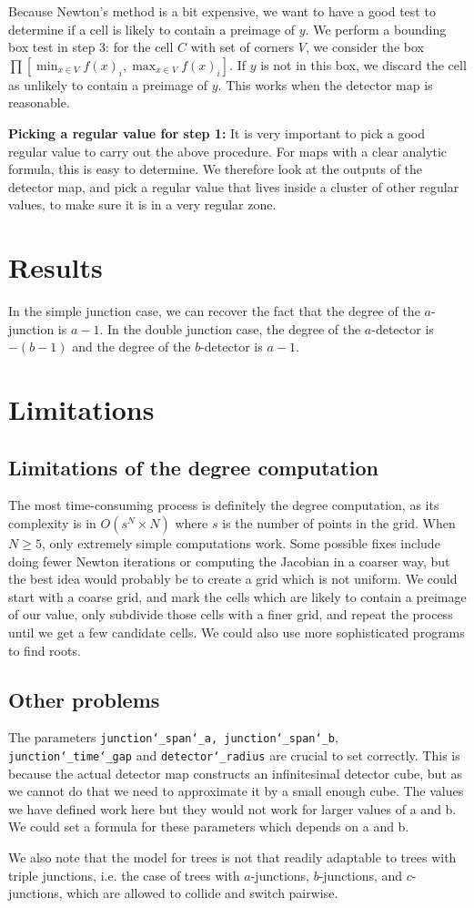\documentclass[12pt]{amsart}
\theoremstyle{plain}
\theoremstyle{definition}
\theoremstyle{remark}
\begin{document}
Because Newton's method is a bit expensive, we want to have a good test to determine if a cell is likely to contain a preimage of $y$.
We perform a bounding box test in step 3: for the cell $C$ with set of corners $V$, 
we consider the box $\displaystyle \prod[\min_{x\in V}f(x)_i,\max_{x\in V}f(x)_i].$
If $y$ is not in this box, we discard the cell as unlikely to contain a preimage of $y$.
This works when the detector map is reasonable.

\textbf{Picking a regular value for step 1:}
It is very important to pick a good regular value to carry out the above procedure.
For maps with a clear analytic formula, this is easy to determine.
We therefore look at the outputs of the detector map,
and pick a regular value that lives inside a cluster of other regular values, to make sure it is in a very regular zone.

\section{Results}

In the simple junction case, we can recover the fact that the degree of the $a$-junction is $a-1$.
In the double junction case, the degree of the $a$-detector is $-(b-1)$ and the degree of the $b$-detector is $a-1$.

\section{Limitations}

\subsection{Limitations of the degree computation}
The most time-consuming process is definitely the degree computation, as its complexity is in $O(s^N\times N)$
where $s$ is the number of points in the grid.
When $N\geq 5$, only extremely simple computations work.
Some possible fixes include doing fewer Newton iterations or computing the Jacobian in a coarser way,
but the best idea would probably be to create a grid which is not uniform.
We could start with a coarse grid, and mark the cells which are likely to contain a preimage of our value,
only subdivide those cells with a finer grid, and repeat the process until we get a few candidate cells.
We could also use more sophisticated programs to find roots.

\subsection{Other problems}
The parameters \texttt{junction\char`_span\char`_a, junction\char`_span\char`_b},\\ 
\texttt{junction\char`_time\char`_gap} 
and \texttt{detector\char`_radius} are crucial to set correctly. 
This is because the actual detector map constructs an infinitesimal detector cube,
but as we cannot do that we need to approximate it by a small enough cube.
The values we have defined work here but they would not work for larger values of a and b.
We could set a formula for these parameters which depends on a and b. 

We also note that the model for trees is not that readily adaptable to trees with triple junctions,
i.e. the case of trees with $a$-junctions, $b$-junctions, and $c$-junctions,
which are allowed to collide and switch pairwise.
\end{document}
